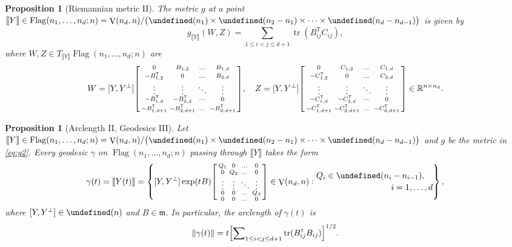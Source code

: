 \documentclass[11pt,reqno]{amsart}%
\newtheorem{proposition}[theorem]{Proposition}
\theoremstyle{definition}
\theoremstyle{remark}
\newcommand{\tp}{{\scriptscriptstyle\mathsf{T}}}
\newcommand{\lb}{\llbracket}
\newcommand{\rb}{\rrbracket}
\let\O\undefined
\DeclareMathOperator{\V}{V}
\DeclareMathOperator{\Flag}{Flag}
\DeclareMathOperator{\O}{O}
\DeclareMathOperator{\tr}{tr}
\begin{document}
\begin{proposition}[Riemannian metric II]\label{prop:metric2}
The metric $g$ at a point $\lb Y \rb \in \Flag(n_1,\dots,n_d;n) = \V(n_d,n) / \bigl(\O(n_1) \times \O(n_2-n_1) \times \dots \times \O(n_d- n_{d-1})\bigr)$ is given by 
\begin{equation}\label{eq:g2}
g_{\lb Y \rb}(W,Z) = \sum_{1\le i < j \le d+1} \tr(B_{ij}^\tp C_{ij}),
\end{equation}
where $W,Z\in T_{\lb Y \rb} \Flag(n_1,\dots,n_d;n)$ are
\[
W = [Y,Y^\perp] \begin{bsmallmatrix}
0 & B_{1,2}  &\dots  &B_{1,d} \\
-B_{1,2}^\tp  & 0   &\dots& B_{2,d} \\
\vdots & \vdots & \ddots  &\vdots\\
-B_{1,d}^\tp & -B_{2,d}^\tp  & \cdots  & 0\\
-B_{1,d+1}^\tp  & -B_{2,d+1}^\tp  &  \dots & -B_{d,d+1}^\tp
\end{bsmallmatrix},\quad  Z = [Y,Y^\perp]\begin{bsmallmatrix}
0 & C_{1,2}  &\dots  &C_{1,d} \\
-C_{1,2}^\tp  & 0   &\dots& C_{2,d} \\
\vdots & \vdots & \ddots  &\vdots\\
-C_{1,d}^\tp & -C_{2,d}^\tp  & \cdots  & 0\\
-C_{1,d+1}^\tp  & -C_{2,d+1}^\tp  &  \dots & -C_{d,d+1}^\tp
\end{bsmallmatrix} \in \mathbb{R}^{n \times n_d}.
\]
\end{proposition}



\begin{proposition}[Arclength II, Geodesics III]\label{prop:geodesic3a}
Let $\lb Y \rb \in \Flag(n_1,\dots,n_d;n)  = \V(n_d,n) / \bigl(\O(n_1) \times \O(n_2-n_1) \times \dots \times \O(n_d- n_{d-1})\bigr)$ and $g$ be the metric in \eqref{eq:g2}. Every geodesic $\gamma$ on  $\Flag(n_1,\dots, n_d;n)$ passing through $\lb Y \rb$ takes the form 
\[
\gamma(t) = \lb Y(t) \rb  = \left\lbrace
[Y,Y^\perp] \exp (tB) \begin{bsmallmatrix}
Q_1 & 0 & \dots & 0\\
0 & Q_2 &\dots & 0 \\
\vdots & \vdots & \ddots & \vdots \\
0 & 0 &\dots & Q_d\\
0 & 0 & \dots & 0
\end{bsmallmatrix} \in  \V(n_d,n) : \begin{multlined} Q_i\in \O(n_i - n_{i-1}),\\ i=1,\dots, d \end{multlined}
\right\rbrace,
\]
where $[Y,Y^\perp]\in \O(n)$ and $B\in \mathfrak{m}$. In particular, the arclength of $\gamma(t)$ is  
\[
\lVert \gamma(t) \rVert =  t \Bigl[  \sum\nolimits_{1\le i<j \le d+1} \tr (B_{ij}^\tp  B_{ij}) \Bigr]^{1/2}. 
\]
\end{proposition}
\end{document}
